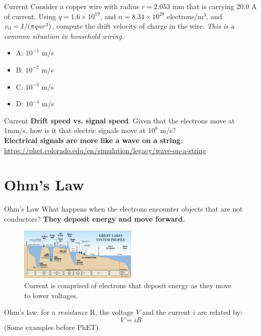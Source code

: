 \documentclass{beamer}
\begin{document}
\begin{frame}{Current}
Consider a copper wire with radius $r = 2.053$ mm that is carrying 20.0 A of current.  Using $q = 1.6\times 10^{19}$, and $n = 8.34 \times 10^{28}$ electrons/m$^3$, and $v_{\rm d} = I/(\pi q n r^2)$, compute the drift velocity of charge in the wire.  \textit{This is a common situation in household wiring.}
\begin{itemize}
\item A: $10^{-1}$ m/s
\item B: $10^{-2}$ m/s
\item C: $10^{-3}$ m/s
\item D: $10^{-4}$ m/s
\end{itemize}
\end{frame}

\begin{frame}{Current}
\textbf{Drift speed vs. signal speed}.  Given that the electrons move at 1mm/s, how is it that electric signals move at $10^8$ m/s? \\ \vspace{1cm}
\textbf{Electrical signals are more like a \alert{wave on a string}}: \\ \url{https://phet.colorado.edu/en/simulation/legacy/wave-on-a-string}
\end{frame}

\section{Ohm's Law}

\begin{frame}{Ohm's Law}
\small
What happens when the electrons encounter objects that are not conductors?  \textbf{They deposit energy and move forward.} \\ \vspace{0.5cm}
\begin{figure}
\centering
\includegraphics[width=0.5\textwidth]{figures/lakes.jpg}
\caption{\label{fig:lakes} Current is comprised of electrons that deposit energy as they move to lower voltages.}
\end{figure}
Ohm's law: for a \textit{resistance} R, the voltage $V$ and the current $i$ are related by:
\begin{equation}
V = i R
\end{equation}
(Some examples before PhET).
\end{frame}
\end{document}
